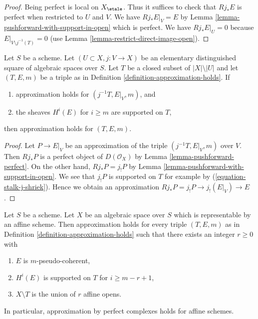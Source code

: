 \begin{proof}
Being perfect is local on $X_\etale$. Thus it suffices to
check that $Rj_*E$ is perfect when restricted to $U$ and $V$.
We have $Rj_*E|_V = E$ by Lemma \ref{lemma-pushforward-with-support-in-open}
which is perfect. We have $Rj_*E|_U = 0$ because
$E|_{V \setminus j^{-1}(T)} = 0$ (use
Lemma \ref{lemma-restrict-direct-image-open}).
\end{proof}

\begin{lemma}
\label{lemma-open}
Let $S$ be a scheme. Let $(U \subset X, j : V \to X)$ be an elementary
distinguished square of algebraic spaces over $S$. Let $T$ be a closed
subset of $|X| \setminus |U|$ and let $(T, E, m)$ be a triple as in
Definition \ref{definition-approximation-holds}. If
\begin{enumerate}
\item approximation holds for $(j^{-1}T, E|_V, m)$, and
\item the sheaves $H^i(E)$ for $i \geq m$ are supported on $T$,
\end{enumerate}
then approximation holds for $(T, E, m)$.
\end{lemma}

\begin{proof}
Let $P \to E|_V$ be an approximation of the triple $(j^{-1}T, E|_V, m)$
over $V$. Then $Rj_*P$ is a perfect object of $D(\mathcal{O}_X)$ by
Lemma \ref{lemma-pushforward-perfect}. On the other hand,
$Rj_*P = j_!P$ by Lemma \ref{lemma-pushforward-with-support-in-open}.
We see that $j_!P$ is supported on $T$ for example by
(\ref{equation-stalk-j-shriek}).
Hence we obtain an approximation $Rj_*P = j_!P \to j_!(E|_V) \to E$.
\end{proof}

\begin{lemma}
\label{lemma-approximation-affine}
Let $S$ be a scheme. Let $X$ be an algebraic space over $S$ which is
representable by an affine scheme. Then approximation holds for every
triple $(T, E, m)$ as in Definition \ref{definition-approximation-holds}
such that there exists an integer $r \geq 0$ with
\begin{enumerate}
\item $E$ is $m$-pseudo-coherent,
\item $H^i(E)$ is supported on $T$ for $i \geq m - r + 1$,
\item $X \setminus T$ is the union of $r$ affine opens.
\end{enumerate}
In particular, approximation by perfect complexes holds for affine schemes.
\end{lemma}

